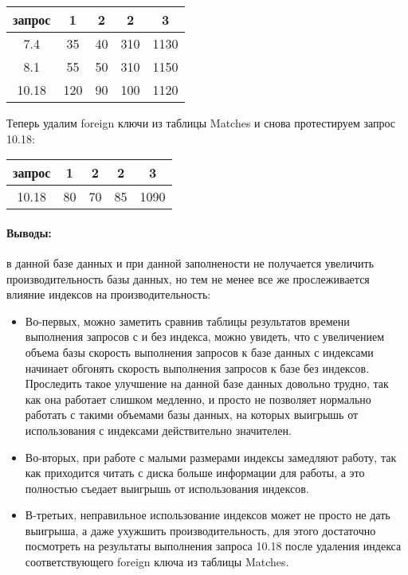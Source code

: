 \documentclass[a4paper,12pt]{article}
\begin{document}
\begin{tabular}[t]{|c|c|c|c|c|}
\hline
запрос   & 1   & 2  & 2   & 3 \\
\hline
7.4      & 35  & 40 & 310 & 1130 \\
\hline
8.1      & 55  & 50 & 310 & 1150 \\
\hline
10.18    & 120 & 90 & 100 & 1120 \\
\hline
\end{tabular}

Теперь удалим foreign ключи из таблицы Matches и снова протестируем запрос 10.18:

\begin{tabular}[t]{|c|c|c|c|c|}
\hline
запрос   & 1   & 2  & 2   & 3 \\
\hline
10.18    & 80 & 70 & 85 & 1090 \\
\hline
\end{tabular}

\paragraph{Выводы:} в данной базе данных и при данной заполнености не получается увеличить производительность базы данных, но тем не менее все же прослеживается влияние индексов на производительность:
\begin{itemize}
\item Во-первых, можно заметить сравнив таблицы результатов времени выполнения запросов с и без индекса, можно увидеть, что с увеличением объема базы скорость выполнения запросов к базе данных с индексами начинает обгонять скорость выполнения запросов к базе без индексов. Проследить такое улучшение на данной базе данных довольно трудно, так как она работает слишком медленно, и просто не позволяет нормально работать с такими объемами базы данных, на которых выигрышь от использования с индексами действительно значителен.

\item Во-вторых, при работе с малыми размерами индексы замедляют работу, так как приходится читать с диска больше информации для работы, а это полностью съедает выигрышь от использования индексов.

\item В-третьих, неправильное использование индексов может не просто не дать выигрыша, а даже ухужшить производительность, для этого достаточно посмотреть на результаты выполнения запроса 10.18 после удаления индекса соответствующего foreign ключа из таблицы Matches.
\end{itemize}
\end{document}
